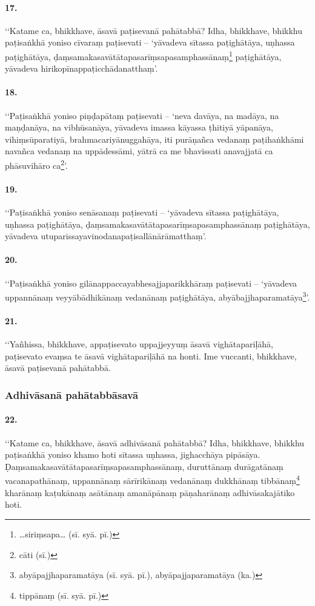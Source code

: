 \paragraph{17.} ‘‘Katame ca, bhikkhave, āsavā paṭisevanā pahātabbā? Idha, bhikkhave, bhikkhu paṭisaṅkhā yoniso cīvaraṃ paṭisevati – ‘yāvadeva sītassa paṭighātāya, uṇhassa paṭighātāya, ḍaṃsamakasavātātapasarīṃsapasamphassānaṃ\footnote{…siriṃsapa… (sī. syā. pī.)} paṭighātāya, yāvadeva hirikopīnappaṭicchādanatthaṃ’.

\paragraph{18.} ‘‘Paṭisaṅkhā yoniso piṇḍapātaṃ paṭisevati – ‘neva davāya, na madāya, na maṇḍanāya, na vibhūsanāya, yāvadeva imassa kāyassa ṭhitiyā yāpanāya, vihiṃsūparatiyā, brahmacariyānuggahāya, iti purāṇañca vedanaṃ paṭihaṅkhāmi navañca vedanaṃ na uppādessāmi, yātrā ca me bhavissati anavajjatā ca phāsuvihāro ca\footnote{cāti (sī.)}’.

\paragraph{19.} ‘‘Paṭisaṅkhā yoniso senāsanaṃ paṭisevati – ‘yāvadeva sītassa paṭighātāya, uṇhassa paṭighātāya, ḍaṃsamakasavātātapasarīṃsapasamphassānaṃ paṭighātāya, yāvadeva utuparissayavinodanapaṭisallānārāmatthaṃ’.

\paragraph{20.} ‘‘Paṭisaṅkhā yoniso gilānappaccayabhesajjaparikkhāraṃ paṭisevati – ‘yāvadeva uppannānaṃ veyyābādhikānaṃ vedanānaṃ paṭighātāya, abyābajjhaparamatāya\footnote{abyāpajjhaparamatāya (sī. syā. pī.), abyāpajjaparamatāya (ka.)}’.

\paragraph{21.} ‘‘Yañhissa, bhikkhave, appaṭisevato uppajjeyyuṃ āsavā vighātapariḷāhā, paṭisevato evaṃsa te āsavā vighātapariḷāhā na honti. Ime vuccanti, bhikkhave, āsavā paṭisevanā pahātabbā.

\subsubsection{Adhivāsanā pahātabbāsavā}

\paragraph{22.} ‘‘Katame ca, bhikkhave, āsavā adhivāsanā pahātabbā? Idha, bhikkhave, bhikkhu paṭisaṅkhā yoniso khamo hoti sītassa uṇhassa, jighacchāya pipāsāya. Ḍaṃsamakasavātātapasarīṃsapasamphassānaṃ, duruttānaṃ durāgatānaṃ vacanapathānaṃ, uppannānaṃ sārīrikānaṃ vedanānaṃ dukkhānaṃ tibbānaṃ\footnote{tippānaṃ (sī. syā. pī.)} kharānaṃ kaṭukānaṃ asātānaṃ amanāpānaṃ pāṇaharānaṃ adhivāsakajātiko hoti.

